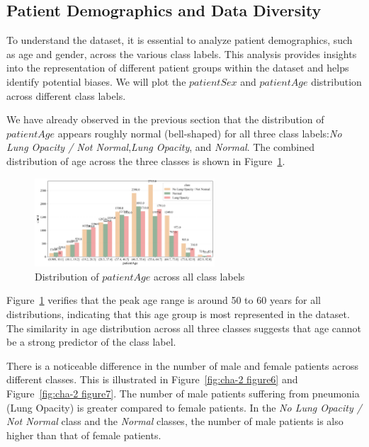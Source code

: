 \subsection{Patient Demographics and Data Diversity}
\label{subsec:chap2 section 1.3}

To understand the dataset, it is essential to analyze patient demographics, such as age and gender, across the various class labels. This analysis provides insights into the representation of different patient groups within the dataset and helps identify potential biases. We will plot the $patientSex$ and $patientAge$ distribution across different class labels.

We have already observed in the previous section that the distribution of $patientAge$ appears roughly normal (bell-shaped) for all three class labels:\emph{No Lung Opacity / Not Normal},\emph{Lung Opacity}, and \emph{Normal}. The combined distribution of age across the three classes is shown in Figure~\ref{fig:cha-2 figure5}.

\begin{figure}[H]
    \begin{center}
        \includegraphics[width = 0.6\textwidth]{figures/Figure8.png}
        \caption{Distribution of $patientAge$ across all class labels}
        \label{fig:cha-2 figure5}
    \end{center}
\end{figure}

Figure~\ref{fig:cha-2 figure5} verifies that the peak age range is around 50 to 60 years for all distributions, indicating that this age group is most represented in the dataset. The similarity in age distribution across all three classes suggests that age cannot be a strong predictor of the class label.

There is a noticeable difference in the number of male and female patients across different classes. This is illustrated in Figure~\ref{fig:cha-2 figure6} and Figure~\ref{fig:cha-2 figure7}. The number of male patients suffering from pneumonia (Lung Opacity) is greater compared to female patients. In the \emph{No Lung Opacity / Not Normal} class and the \emph{Normal} classes,  the number of male patients is also higher than that of female patients.

